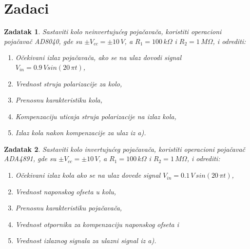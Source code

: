 \pagebreak
\section{Zadaci}

\newtheorem{zadatak}{Zadatak}

\begin{zadatak}
    Sastaviti kolo neinvertujućeg pojačavača, koristiti operacioni pojačavač AD8040, gde su $\pm V_{cc}=\pm10\,V$, a $R_1 = 100 \,k\Omega$ i $R_2 = 1 \,M\Omega$, i odrediti:

    \begin{enumerate}
        \item [a)] Očekivani izlaz pojačavača, ako se na ulaz dovodi signal $V_{in} = 0.9\,V sin(20\,\pi t)$,
        \item [b)] Vrednost struja polarizacije za kolo,
        \item [c)] Prenosnu karakteristiku kola,
        \item [d)] Kompenzaciju uticaja struja polarizacije na izlaz kola,
        \item [e)] Izlaz kola nakon kompenzacije za ulaz iz a).
    \end{enumerate}
\end{zadatak}

\begin{zadatak}
    Sastaviti kolo invertujućeg pojačavača, koristiti operacioni pojačavač ADA4891, gde su $\pm V_{cc}=\pm10\,V$, a $R_1 = 100 \,k\Omega$ i $R_2 = 1 \,M\Omega$, i odrediti:
    
    \begin{enumerate}
        \item [a)] Očekivani izlaz kola ako se na ulaz dovede signal $V_{in} = 0.1\,V\,sin(20\,\pi t)$,
        \item [b)] Vrednost naponskog ofseta u kolu,
        \item [c)] Prenosnu karakteristiku pojačavača,
        \item [d)] Vrednost otpornika za kompenzaciju naponskog ofseta i
        \item [e)] Vrednost izlaznog signala za ulazni signal iz a).
    \end{enumerate}
\end{zadatak}

